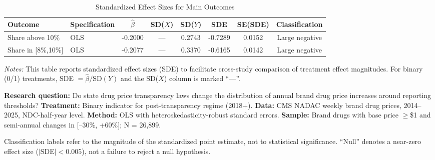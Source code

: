\begin{table}[H]
\centering
\caption{Standardized Effect Sizes for Main Outcomes}
\label{tab:sde}
\footnotesize
\begin{tabular}{llcccccc}
\toprule
Outcome & Specification & $\hat{\beta}$ & SD($X$) & SD($Y$) & SDE & SE(SDE) & Classification \\
\midrule
Share above 10\% & OLS & -0.2000 & --- & 0.2743 & -0.7289 & 0.0152 & Large negative \\
Share in [8\%,10\%] & OLS & -0.2077 & --- & 0.3370 & -0.6165 & 0.0142 & Large negative \\
\bottomrule
\end{tabular}
\par\vspace{0.3em}
{\footnotesize \emph{Notes:} This table reports standardized effect sizes (SDE) to facilitate cross-study comparison of treatment effect magnitudes. For binary (0/1) treatments, SDE $= \hat{\beta} / \text{SD}(Y)$ and the SD($X$) column is marked ``---''.

\textbf{Research question:} Do state drug price transparency laws change the distribution of annual brand drug price increases around reporting thresholds?
\textbf{Treatment:} Binary indicator for post-transparency regime (2018+).
\textbf{Data:} CMS NADAC weekly brand drug prices, 2014--2025, NDC-half-year level.
\textbf{Method:} OLS with heteroskedasticity-robust standard errors.
\textbf{Sample:} Brand drugs with base price $\geq$\$1 and semi-annual changes in [--30\%, +60\%]; N = 26,899.

Classification labels refer to the magnitude of the standardized point estimate, not to statistical significance. ``Null'' denotes a near-zero effect size ($|$SDE$| < 0.005$), not a failure to reject a null hypothesis.}
\end{table}
